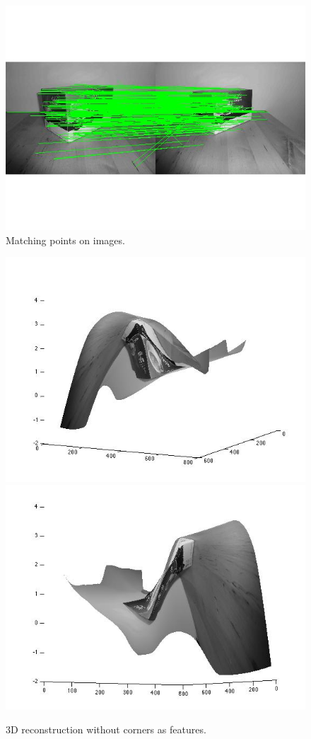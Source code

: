 \begin{figure}[H]
\begin{center}
\includegraphics[width=0.95\linewidth]{figures/sift.jpg}
\end{center}
\caption{Matching points on images.}
\label{sift_features}
\end{figure}

\begin{figure}[H]
\begin{center}
\includegraphics[width=0.45\linewidth]{figures/kcup_nocorners1.jpg}
\includegraphics[width=0.45\linewidth]{figures/kcup_nocorners2.jpg}
\end{center}
\caption{3D reconstruction without corners as features.}
\label{kcup_nocorners}
\end{figure}

